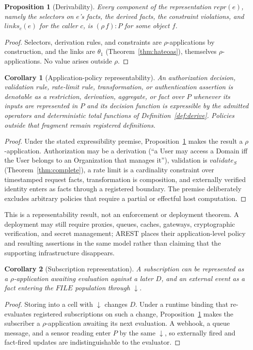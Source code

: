 \documentclass[10pt,twocolumn]{article}
\theoremstyle{plain}
\newtheorem{proposition}{Proposition}
\newtheorem{corollary}{Corollary}
\theoremstyle{definition}
\begin{document}
\begin{proposition}[Derivability]\label{prop:derive}
Every component of the representation $\mathit{repr}(e)$, namely the selectors on $e$'s facts, the derived facts, the constraint violations, and $\mathit{links}_c(e)$ for the caller $c$, is $(\rho\,f)\!:\!P$ for some object $f$.
\end{proposition}
\begin{proof}
Selectors, derivation rules, and constraints are $\rho$-applications by construction, and the links are $\theta_1$ (Theorem~\ref{thm:hateoas}), themselves $\rho$-applications. No value arises outside $\rho$.
\end{proof}

\begin{corollary}[Application-policy representability]\label{cor:middleware}
An authorization decision, validation rule, rate-limit rule, transformation, or authentication assertion is denotable as a restriction, derivation, aggregate, or fact over $P$ whenever its inputs are represented in $P$ and its decision function is expressible by the admitted operators and deterministic total functions of Definition~\ref{def:derive}. Policies outside that fragment remain registered definitions.
\end{corollary}
\begin{proof}
Under the stated expressibility premise, Proposition~\ref{prop:derive} makes the result a $\rho$-application. Authorization may be a derivation (``a User may access a Domain iff the User belongs to an Organization that manages it''), validation is $\mathit{validate}_S$ (Theorem~\ref{thm:complete}), a rate limit is a cardinality constraint over timestamped request facts, transformation is composition, and externally verified identity enters as facts through a registered boundary. The premise deliberately excludes arbitrary policies that require a partial or effectful host computation.
\end{proof}

\noindent This is a representability result, not an enforcement or deployment theorem. A deployment may still require proxies, queues, caches, gateways, cryptographic verification, and secret management; AREST places their application-level policy and resulting assertions in the same model rather than claiming that the supporting infrastructure disappears.

\begin{corollary}[Subscription representation]\label{cor:stream}
A subscription can be represented as a $\rho$-application awaiting evaluation against a later $D$, and an external event as a fact entering the $\mathit{FILE}$ population through $\downarrow$.
\end{corollary}
\begin{proof}
Storing into a cell with $\downarrow$ changes $D$. Under a runtime binding that re-evaluates registered subscriptions on such a change, Proposition~\ref{prop:derive} makes the subscriber a $\rho$-application awaiting its next evaluation. A webhook, a queue message, and a sensor reading enter $P$ by the same $\downarrow$, so externally fired and fact-fired updates are indistinguishable to the evaluator.
\end{proof}
\end{document}
